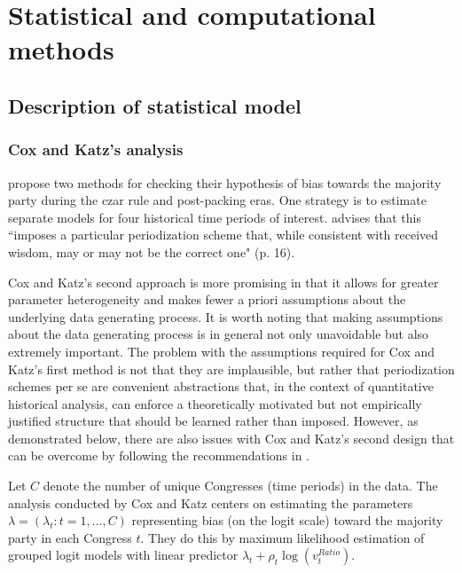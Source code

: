 \section{Statistical and computational methods}
\label{ck_stats}

\subsection{Description of statistical model}
\label{subsection_methods}

\subsubsection{Cox and Katz's analysis}

 propose two methods for checking their hypothesis 
of bias towards the majority party during the czar rule and post-packing eras. One strategy 
is to estimate separate models for four historical time periods of interest. 
 advises that this ``imposes a particular periodization scheme 
that, while consistent with received wisdom, may or may not be the correct one" (p. 16). 

Cox and Katz's second approach is more promising in that it allows for greater parameter 
heterogeneity and makes fewer a priori assumptions about the underlying data generating 
process. It is worth noting that making assumptions about the data generating process is in 
general not only unavoidable but also extremely important. The problem with the assumptions 
required for Cox and Katz's first method is not that they are implausible, but rather that 
periodization schemes per se are convenient abstractions that, in the context of quantitative 
historical analysis, can enforce a theoretically motivated but not empirically justified structure 
that should be learned rather than imposed. However, as demonstrated below, there are also 
issues with Cox and Katz's second design that can be overcome by following the recommendations 
in . 

Let $C$ denote the number of unique Congresses (time periods) in the data. 
The analysis conducted by Cox and Katz centers on estimating the parameters  
$\lambda = (\lambda_t : t = 1, \dots, C)$ representing bias (on the logit scale) toward 
the majority party in each Congress $t$. They do this by maximum likelihood estimation 
of grouped logit models with linear predictor $ \lambda_t + \rho_t \log{\left(v_t^{Ratio} \right)}$. 

